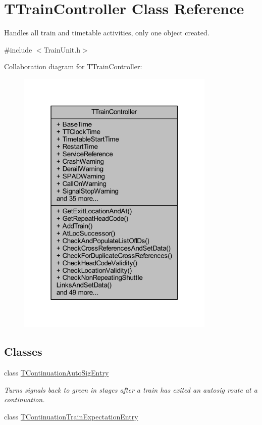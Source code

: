 \hypertarget{class_t_train_controller}{}\section{T\+Train\+Controller Class Reference}
\label{class_t_train_controller}


Handles all train and timetable activities, only one object created.  




{\ttfamily \#include $<$Train\+Unit.\+h$>$}



Collaboration diagram for T\+Train\+Controller\+:\nopagebreak
\begin{figure}[H]
\begin{center}
\leavevmode
\includegraphics[width=268pt]{class_t_train_controller__coll__graph}
\end{center}
\end{figure}
\subsection*{Classes}
\begin{DoxyCompactItemize}
\item 
class \mbox{\hyperlink{class_t_train_controller_1_1_t_continuation_auto_sig_entry}{T\+Continuation\+Auto\+Sig\+Entry}}
\begin{DoxyCompactList}\small\item\em Turns signals back to green in stages after a train has exited an autosig route at a continuation. \end{DoxyCompactList}\item 
class \mbox{\hyperlink{class_t_train_controller_1_1_t_continuation_train_expectation_entry}{T\+Continuation\+Train\+Expectation\+Entry}}
\end{DoxyCompactItemize}
